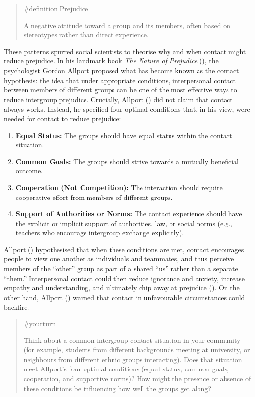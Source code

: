 \documentclass[
  letterpaper,
]{book}
\providecommand{\tightlist}{%
  \setlength{\itemsep}{0pt}\setlength{\parskip}{0pt}}\usepackage{longtable,booktabs,array}
\begin{document}
\begin{quote}
\label{def-prejudice}{\#definition} Prejudice

A negative attitude toward a group and its members, often based on
stereotypes rather than direct experience.
\end{quote}

These patterns spurred social scientists to theorise why and when
contact might reduce prejudice. In his landmark book \emph{The Nature of
Prejudice} (), the psychologist Gordon
Allport proposed what has become known as the contact hypothesis: the
idea that under appropriate conditions, interpersonal contact between
members of different groups can be one of the most effective ways to
reduce intergroup prejudice. Crucially, Allport
() did not claim that contact always
works. Instead, he specified four optimal conditions that, in his view,
were needed for contact to reduce prejudice:

\begin{enumerate}
\def\labelenumi{\arabic{enumi}.}
\tightlist
\item
  \textbf{Equal Status:} The groups should have equal status within the
  contact situation.
\item
  \textbf{Common Goals:} The groups should strive towards a mutually
  beneficial outcome.
\item
  \textbf{Cooperation (Not Competition):} The interaction should require
  cooperative effort from members of different groups.
\item
  \textbf{Support of Authorities or Norms:} The contact experience
  should have the explicit or implicit support of authorities, law, or
  social norms (e.g., teachers who encourage intergroup exchange
  explicitly).
\end{enumerate}

Allport () hypothesised that when these
conditions are met, contact encourages people to view one another as
individuals and teammates, and thus perceive members of the ``other''
group as part of a shared ``us'' rather than a separate ``them.''
Interpersonal contact could then reduce ignorance and anxiety, increase
empathy and understanding, and ultimately chip away at prejudice
(). On the other hand, Allport
() warned that contact in unfavourable
circumstances could backfire.

\begin{quote}
{\#yourturn}

Think about a common intergroup contact situation in your community (for
example, students from different backgrounds meeting at university, or
neighbours from different ethnic groups interacting). Does that
situation meet Allport's four optimal conditions (equal status, common
goals, cooperation, and supportive norms)? How might the presence or
absence of these conditions be influencing how well the groups get
along?
\end{quote}
\end{document}
